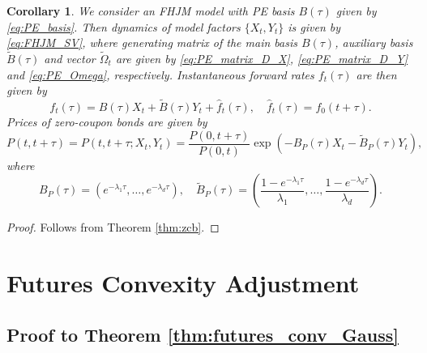 \documentclass[pdftex,11pt,a4paper] {article}
\newtheorem{corollary}{Corollary}[section]
\begin{document}
\begin{corollary}\label{thm:Nelson_Siegel2}
We consider an FHJM model with PE basis $B(\tau)$ given by \eqref{eq:PE_basis}. Then  dynamics of model factors $\{X_t, Y_t\}$ is given by \eqref{eq:FHJM_SV}, where generating matrix of the main basis $B(\tau)$, auxiliary basis $\tilde B(\tau)$ and vector $\tilde\Omega_t$ are given by \eqref{eq:PE_matrix_D_X}, \eqref{eq:PE_matrix_D_Y} and \eqref{eq:PE_Omega}, respectively. 
Instantaneous forward rates $f_t(\tau)$ are then given by
\begin{equation*}
f_{t}(\tau) = B(\tau) X_{t} + \tilde{B}(\tau) Y_{t}  +  \hat f_t(\tau),\quad \hat f_t(\tau)=f_{0}(t+\tau).
\end{equation*}
Prices of zero-coupon bonds are given by
\begin{equation}\label{eq:NS_zcb}
P(t,t+\tau) = P(t,t+\tau; X_t, Y_t) = \frac{P(0,t+\tau)}{P(0,t)}\exp\left(-B_P(\tau) X_{t} - \tilde{B}_P(\tau) Y_{t}\right),
\end{equation}
where 
\begin{equation*}
B_P(\tau)=\left(e^{-\lambda_1\tau}, \ldots, e^{-\lambda_d\tau}\right),\quad 
\tilde{B}_P(\tau)=\left(\frac{1-e^{-\lambda_1\tau}}{\lambda_1}, \ldots, \frac{1-e^{-\lambda_d\tau}}{\lambda_d}\right).
\end{equation*}
\end{corollary}

\begin{proof} Follows from Theorem \ref{thm:zcb}.
\end{proof}



\section{Futures Convexity Adjustment}\label{app:convexity_adj}

\subsection{Proof to Theorem \ref{thm:futures_conv_Gauss}}\label{app:futures_conv_Gauss}
\end{document}
